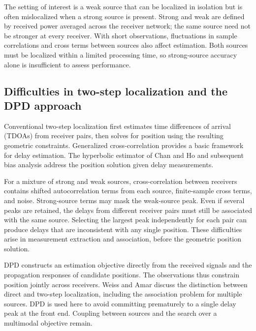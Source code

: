 \documentclass[11pt,a4paper]{article}
\numberwithin{equation}{section}
\numberwithin{figure}{section}
\numberwithin{table}{section}
\begin{document}
The setting of interest is a weak source that can be localized in isolation but is often mislocalized when a strong source is present. Strong and weak are defined by received power averaged across the receiver network; the same source need not be stronger at every receiver. With short observations, fluctuations in sample correlations and cross terms between sources also affect estimation. Both sources must be localized within a limited processing time, so strong-source accuracy alone is insufficient to assess performance.

\subsection{Difficulties in two-step localization and the DPD approach}\label{sec:1.2}

Conventional two-step localization first estimates time differences of arrival (TDOAs) from receiver pairs, then solves for position using the resulting geometric constraints. Generalized cross-correlation provides a basic framework for delay estimation\cite{ref01}. The hyperbolic estimator of Chan and Ho and subsequent bias analysis address the position solution given delay measurements\cite{ref02,ref03}.

For a mixture of strong and weak sources, cross-correlation between receivers contains shifted autocorrelation terms from each source, finite-sample cross terms, and noise. Strong-source terms may mask the weak-source peak. Even if several peaks are retained, the delays from different receiver pairs must still be associated with the same source. Selecting the largest peak independently for each pair can produce delays that are inconsistent with any single position. These difficulties arise in measurement extraction and association, before the geometric position solution.

DPD constructs an estimation objective directly from the received signals and the propagation responses of candidate positions. The observations thus constrain position jointly across receivers. Weiss and Amar discuss the distinction between direct and two-step localization, including the association problem for multiple sources\cite{ref04}. DPD is used here to avoid committing prematurely to a single delay peak at the front end. Coupling between sources and the search over a multimodal objective remain.

\end{document}
